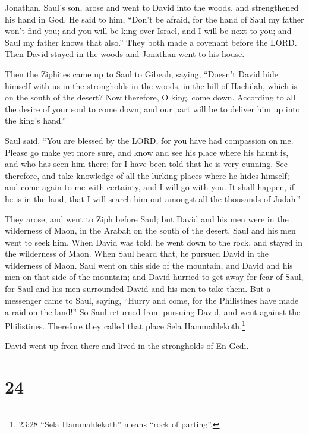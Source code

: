  Jonathan, Saul's son, arose and went to David into the
woods, and strengthened his hand in God.  He said to him,
``Don't be afraid, for the hand of Saul my father won't find you; and
you will be king over Israel, and I will be next to you; and Saul my
father knows that also.''  They both made a covenant before
the LORD. Then David stayed in the woods and Jonathan went to his house.

 Then the Ziphites came up to Saul to Gibeah, saying,
``Doesn't David hide himself with us in the strongholds in the woods, in
the hill of Hachilah, which is on the south of the desert? 
Now therefore, O king, come down. According to all the desire of your
soul to come down; and our part will be to deliver him up into the
king's hand.''

 Saul said, ``You are blessed by the LORD, for you have had
compassion on me.  Please go make yet more sure, and know
and see his place where his haunt is, and who has seen him there; for I
have been told that he is very cunning.  See therefore, and
take knowledge of all the lurking places where he hides himself; and
come again to me with certainty, and I will go with you. It shall
happen, if he is in the land, that I will search him out amongst all the
thousands of Judah.''

 They arose, and went to Ziph before Saul; but David and
his men were in the wilderness of Maon, in the Arabah on the south of
the desert.  Saul and his men went to seek him. When David
was told, he went down to the rock, and stayed in the wilderness of
Maon. When Saul heard that, he pursued David in the wilderness of Maon.
 Saul went on this side of the mountain, and David and his
men on that side of the mountain; and David hurried to get away for fear
of Saul, for Saul and his men surrounded David and his men to take them.
 But a messenger came to Saul, saying, ``Hurry and come,
for the Philistines have made a raid on the land!''  So
Saul returned from pursuing David, and went against the Philistines.
Therefore they called that place Sela Hammahlekoth.\footnote{23:28
  ``Sela Hammahlekoth'' means ``rock of parting''.}

 David went up from there and lived in the strongholds of
En Gedi.

\hypertarget{section-23}{%
\section{24}\label{section-23}}

